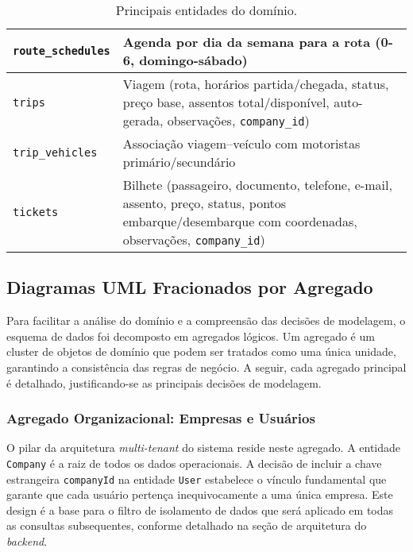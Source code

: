 \begin{table}[H]
\begin{tabular}{|p{3.5cm}|p{11.5cm}|}
    \hline
    \texttt{route\_schedules} & Agenda por dia da semana para a rota (0-6, domingo-sábado)                                                                                                                                     \\
    \hline
    \texttt{trips}            & Viagem (rota, horários partida/chegada, status, preço base, assentos total/disponível, auto-gerada, observações, \texttt{company\_id})                                                         \\
    \hline
    \texttt{trip\_vehicles}   & Associação viagem--veículo com motoristas primário/secundário                                                                                                                                  \\
    \hline
    \texttt{tickets}          & Bilhete (passageiro, documento, telefone, e-mail, assento, preço, status, pontos embarque/desembarque com coordenadas, observações, \texttt{company\_id})                                      \\
    \hline
  \end{tabular}
  \caption{Principais entidades do domínio.}
  \label{tab:principais-entidades}
\end{table}

\subsection{Diagramas UML Fracionados por Agregado}

Para facilitar a análise do domínio e a compreensão das decisões de modelagem, o esquema de dados foi decomposto em agregados lógicos. Um agregado é um cluster de objetos de domínio que podem ser tratados como uma única unidade, garantindo a consistência das regras de negócio. A seguir, cada agregado principal é detalhado, justificando-se as principais decisões de modelagem.

\subsubsection*{Agregado Organizacional: Empresas e Usuários}

O pilar da arquitetura \textit{multi-tenant} do sistema reside neste agregado. A entidade \texttt{Company} é a raiz de todos os dados operacionais. A decisão de incluir a chave estrangeira \texttt{companyId} na entidade \texttt{User} estabelece o vínculo fundamental que garante que cada usuário pertença inequivocamente a uma única empresa. Este design é a base para o filtro de isolamento de dados que será aplicado em todas as consultas subsequentes, conforme detalhado na seção de arquitetura do \textit{backend}.

